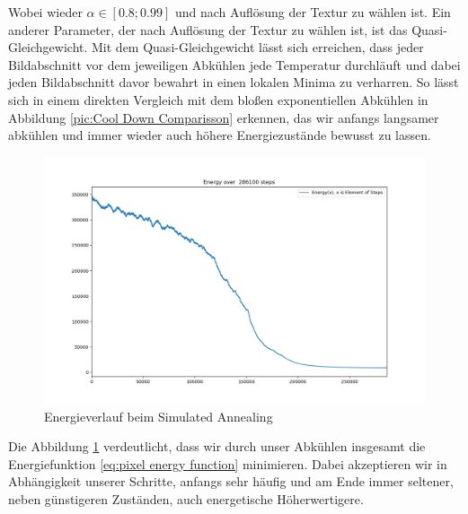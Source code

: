 Wobei wieder $\alpha \in [0.8; 0.99]$ und nach Auflösung der Textur zu wählen ist. Ein anderer Parameter, der nach 
Auflösung der Textur zu wählen ist, ist das Quasi-Gleichgewicht. Mit dem Quasi-Gleichgewicht lässt sich erreichen, 
dass jeder Bildabschnitt vor dem jeweiligen Abkühlen jede Temperatur durchläuft und dabei jeden Bildabschnitt davor 
bewahrt in einen lokalen Minima zu verharren.
So lässt sich in einem direkten Vergleich mit dem bloßen exponentiellen Abkühlen in Abbildung 
\ref{pic:Cool Down Comparisson} erkennen, das wir anfangs langsamer abkühlen und immer wieder auch 
höhere Energiezustände bewusst zu lassen.

\begin{figure}[H]
    \centering
    \includegraphics[width=\linewidth]{content/simulatedAnnealing/Bilder/Energy_286100_steps_KirkpatrickCooldownSchedule.png}
    \caption{Energieverlauf beim Simulated Annealing}
    \label{pic:kirkpatrick energie verlauf}
\end{figure}

Die Abbildung \ref{pic:kirkpatrick energie verlauf} verdeutlicht, dass wir durch unser Abkühlen insgesamt die 
Energiefunktion \ref{eq:pixel energy function} minimieren. Dabei akzeptieren wir in Abhängigkeit unserer Schritte,
anfangs sehr häufig und am Ende immer seltener, neben günstigeren Zuständen, auch energetische Höherwertigere.

